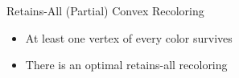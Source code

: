 \begin{frame}{Retains-All (Partial) Convex Recoloring}

\begin{itemize}

\item
At least one vertex of every color survives

\pause\item
There is an optimal retains-all recoloring

\end{itemize}

\end{frame}
